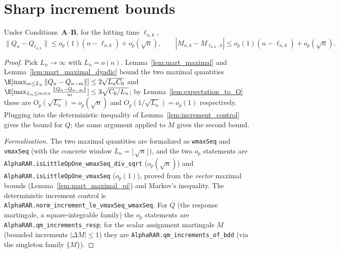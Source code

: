 \section{Sharp increment bounds}
\label{sec:norm_bounds}

\begin{lemma}\label{lem:QM_increments}
\leanok
{}
Under Conditions~\textbf{A}--\textbf{B}, for the hitting time $\ell_{n,k}$,
\[
  \|Q_n - Q_{\ell_{n,k}}\| \le o_p(1)(n-\ell_{n,k}) + o_p(\sqrt n),
  \qquad
  |M_{n,k} - M_{\ell_{n,k},k}| \le o_p(1)(n-\ell_{n,k}) + o_p(\sqrt n).
\]
\end{lemma}

\begin{proof}\leanok
{}
Pick $L_n\to\infty$ with $L_n = o(n)$. Lemma~\ref{lem:mart_maximal} and
Lemma~\ref{lem:mart_maximal_dyadic} bound the two maximal quantities
$\E[\max_{m\le L_n}\|Q_n-Q_{n-m}\|]\le 2\sqrt{L_n C_0}$ and
$\E[\max_{L_n\le m<n}\frac{\|Q_n-Q_{n-m}\|}{m}]\le 3\sqrt{C_0/L_n}$; by
Lemma~\ref{lem:expectation_to_O} these are $O_p(\sqrt{L_n})=o_p(\sqrt n)$ and
$O_p(1/\sqrt{L_n})=o_p(1)$ respectively. Plugging into the deterministic
inequality of Lemma~\ref{lem:increment_control} gives the bound for $Q$; the same
argument applied to $M$ gives the second bound.

\emph{Formalization.} The two maximal quantities are formalized as \texttt{wmaxSeq} and
\texttt{vmaxSeq} (with the concrete window $L_n=\lfloor\sqrt n\rfloor$), and the two $o_p$ statements
are \texttt{AlphaRAR.isLittleOpOne\_wmaxSeq\_div\_sqrt} ($o_p(\sqrt n)$) and
\texttt{AlphaRAR.isLittleOpOne\_vmaxSeq} ($o_p(1)$), proved from the \emph{vector} maximal bounds
(Lemma~\ref{lem:mart_maximal_pi}) and Markov's inequality. The deterministic increment control is
\texttt{AlphaRAR.norm\_increment\_le\_vmaxSeq\_wmaxSeq}. For $Q$ (the response martingale, a
square-integrable family) the $o_p$ statements are \texttt{AlphaRAR.qm\_increments\_resp}; for the
scalar assignment martingale $M$ (bounded increments $|\Delta M|\le1$) they are
\texttt{AlphaRAR.qm\_increments\_of\_bdd} (via the singleton family $\{M\}$).
\end{proof}

